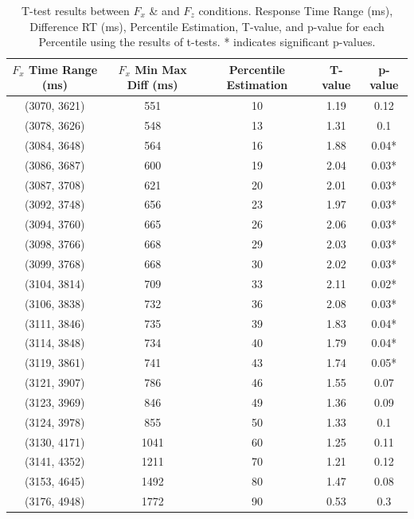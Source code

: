 \documentclass[12pt,oneside,openright]{report}
\begin{document}
\begin{table}[!ht]
    \centering
    \begin{tabular}{ccccc}
    \hline
    \textbf{$F_x$ Time Range (ms)} & \textbf{$F_x$ Min Max Diff (ms)} & \textbf{Percentile Estimation} & \textbf{T-value} & \textbf{p-value} \\ \hline
    (3070, 3621) & 551 & 10  & 1.19 & 0.12 \\
    (3078, 3626) & 548 & 13 & 1.31 & 0.1  \\
    (3084, 3648) & 564 & 16 & 1.88 & 0.04* \\
    (3086, 3687) & 600 & 19 & 2.04 & 0.03* \\
    (3087, 3708) & 621 & 20  & 2.01 & 0.03* \\
    (3092, 3748) & 656 & 23 & 1.97 & 0.03* \\
    (3094, 3760) & 665 & 26 & 2.06 & 0.03* \\
    (3098, 3766) & 668 & 29 & 2.03 & 0.03* \\
    (3099, 3768) & 668 & 30  & 2.02 & 0.03* \\
    (3104, 3814) & 709 & 33 & 2.11 & 0.02* \\
    (3106, 3838) & 732 & 36 & 2.08 & 0.03* \\
    (3111, 3846) & 735 & 39 & 1.83 & 0.04* \\
    (3114, 3848) & 734 & 40  & 1.79 & 0.04* \\
    (3119, 3861) & 741 & 43 & 1.74 & 0.05* \\
    (3121, 3907) & 786 & 46 & 1.55 & 0.07  \\
    (3123, 3969) & 846 & 49 & 1.36 & 0.09  \\
    (3124, 3978) & 855 & 50  & 1.33 & 0.1   \\
    (3130, 4171) & 1041 & 60  & 1.25 & 0.11  \\
    (3141, 4352) & 1211 & 70  & 1.21 & 0.12  \\
    (3153, 4645) & 1492 & 80  & 1.47 & 0.08  \\
    (3176, 4948) & 1772 & 90 & 0.53 & 0.3   \\ \hline
    \end{tabular}
    \caption{T-test results between $F_x$ \& and $F_z$ conditions. Response Time Range (ms), Difference RT (ms), Percentile Estimation, T-value, and p-value for each Percentile using the results of t-tests. * indicates significant p-values.}
    \label{tab:response-time-range}
\end{table}
\end{document}
